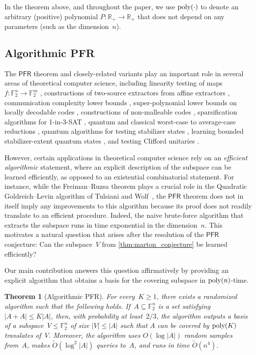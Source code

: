 \documentclass[11pt]{amsart}
\newcommand{\R}{\mathbb{R}} %
\newcommand{\F}{\mathbb{F}} %
\newcommand{\PFR}{\textsf{PFR}}
\newcommand{\poly}{\mbox{\rm poly}}
\theoremstyle{plain}
\newtheorem{theorem}{Theorem}[section]
\theoremstyle{definition}
\theoremstyle{remark}
\begin{document}
In the theorem above, and throughout the paper, we use $\poly(\cdot)$ to denote an arbitrary (positive) polynomial $P: \R_+ \to \R_+$ that does not depend on any parameters (such as the dimension~$n$).




\subsection{Algorithmic PFR}
The $\PFR$ theorem and closely-related variants play an important role in several areas of theoretical computer science, including linearity testing of maps $f \colon \F_2^n \to \F_2^m$ \cite{samorodnitsky2007low}, constructions of two-source extractors from affine extractors \cite{zewi2011affine}, communication complexity lower bounds \cite{ben2014additive},
super-polynomial lower bounds on locally decodable codes \cite{bhowmick2013new}, constructions of non-malleable codes \cite{aggarwal2014non}, sparsification algorithms for 1-in-3-SAT \cite{bedert2025strong}, quantum and classical worst-case to average-case reductions \cite{asadi2022worst,asadi2024quantum}, quantum algorithms for testing stabilizer states \cite{ad2024tolerant, bao2025tolerant,mehraban2024improved}, learning bounded stabilizer-extent quantum states \cite{SCforstabilizers}, and testing Clifford unitaries \cite{hinsche2025clifford}.

However, certain applications in theoretical computer science rely on an \emph{efficient algorithmic} statement, where an explicit description of the subspace can be learned efficiently, as opposed to an existential combinatorial statement.
For instance, while the Freiman--Ruzsa theorem plays a crucial role in the Quadratic Goldreich--Levin algorithm of Tulsiani and Wolf~\cite{TulsianiW2014}, the $\PFR$ theorem does not in itself imply any improvements to this algorithm because its proof does not readily translate to an efficient procedure.
Indeed, the naive brute-force algorithm that extracts the subspace runs in time exponential in the dimension~$n$.
This motivates a natural question that arises after the resolution of the $\PFR$ conjecture: 
Can the subspace~$V$ from \cref{thm:marton_conjecture} be learned efficiently?

Our main contribution answers this question affirmatively by providing an explicit algorithm that obtains a basis for the covering subspace in $\poly(n)$-time.

\begin{theorem}[Algorithmic \PFR]\label{thm:APFR}
    For every~$K \geq 1$, there exists a randomized algorithm such that the following holds.
    If~$A\subseteq \F_2^n$ is a set satisfying $|A+A| \leq K|A|$, then, with probability at least~$2/3$, the algorithm outputs a basis of a subspace~$V\leq \F_2^n$ of size $|V|\leq |A|$ such that $A$ can be covered by $\poly(K)$ translates of~$V$.
    Moreover, the algorithm uses $O(\log|A|)$ random samples from~$A$, makes $\widetilde{O}(\log^2|A|)$ queries to~$A$, and runs in time $\widetilde{O}(n^4)$.
\end{theorem}
\end{document}
